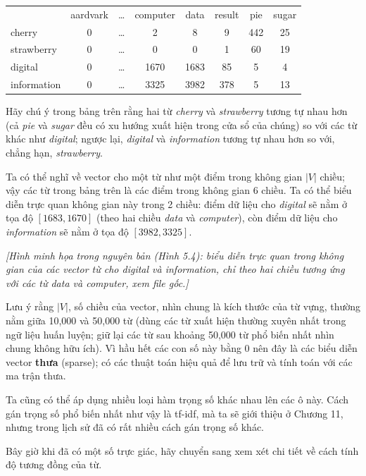 \begin{center}
\begin{tabular}{lccccccc}
 & aardvark & \ldots & computer & data & result & pie & sugar \\
cherry & 0 & \ldots & 2 & 8 & 9 & 442 & 25 \\
strawberry & 0 & \ldots & 0 & 0 & 1 & 60 & 19 \\
digital & 0 & \ldots & 1670 & 1683 & 85 & 5 & 4 \\
information & 0 & \ldots & 3325 & 3982 & 378 & 5 & 13 \\
\end{tabular}
\end{center}

Hãy chú ý trong bảng trên rằng hai từ \emph{cherry} và \emph{strawberry} tương tự nhau hơn (cả \emph{pie} và \emph{sugar} đều có xu hướng xuất hiện trong cửa sổ của chúng) so với các từ khác như \emph{digital}; ngược lại, \emph{digital} và \emph{information} tương tự nhau hơn so với, chẳng hạn, \emph{strawberry}.

Ta có thể nghĩ về vector cho một từ như một điểm trong không gian $|V|$ chiều; vậy các từ trong bảng trên là các điểm trong không gian 6 chiều. Ta có thể biểu diễn trực quan không gian này trong 2 chiều: điểm dữ liệu cho \emph{digital} sẽ nằm ở tọa độ $[1683, 1670]$ (theo hai chiều \emph{data} và \emph{computer}), còn điểm dữ liệu cho \emph{information} sẽ nằm ở tọa độ $[3982, 3325]$.

\textit{[Hình minh họa trong nguyên bản (Hình 5.4): biểu diễn trực quan trong không gian của các vector từ cho \emph{digital} và \emph{information}, chỉ theo hai chiều tương ứng với các từ \emph{data} và \emph{computer}, xem file gốc.]}

Lưu ý rằng $|V|$, số chiều của vector, nhìn chung là kích thước của từ vựng, thường nằm giữa 10,000 và 50,000 từ (dùng các từ xuất hiện thường xuyên nhất trong ngữ liệu huấn luyện; giữ lại các từ sau khoảng 50,000 từ phổ biến nhất nhìn chung không hữu ích). Vì hầu hết các con số này bằng 0 nên đây là các biểu diễn vector \textbf{thưa} (sparse); có các thuật toán hiệu quả để lưu trữ và tính toán với các ma trận thưa.

Ta cũng có thể áp dụng nhiều loại hàm trọng số khác nhau lên các ô này. Cách gán trọng số phổ biến nhất như vậy là tf-idf, mà ta sẽ giới thiệu ở Chương 11, nhưng trong lịch sử đã có rất nhiều cách gán trọng số khác.

Bây giờ khi đã có một số trực giác, hãy chuyển sang xem xét chi tiết về cách tính độ tương đồng của từ.

